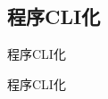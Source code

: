 \subsection{程序CLI化}

\begin{frame}[standout] 程序CLI化 \end{frame}
\begin{frame}[fragile]{程序CLI化}
\end{frame}